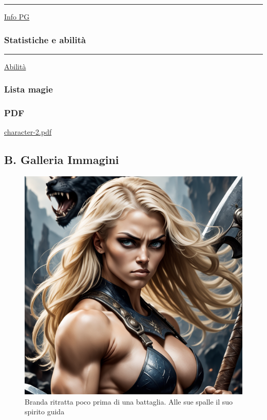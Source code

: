 \begin{center}\rule{0.5\linewidth}{0.5pt}\end{center}

\href{Info\%20PG\%207c4b83bfcd2e4a5382b1fdc0695356d4.csv}{Info PG}

\subsubsection{Statistiche e abilità}\label{statistiche-e-abilituxe0}

\begin{center}\rule{0.5\linewidth}{0.5pt}\end{center}

\href{Abilita\%CC\%80\%20598db4b9c1424724926dfa6e5f543ee8.csv}{Abilità}

\subsubsection{Lista magie}\label{lista-magie}

\subsubsection{PDF}\label{pdf}

\url{character-2.pdf}

\subsection{B. Galleria Immagini}\label{b.-galleria-immagini}

\begin{figure}
\centering
\includegraphics{create-a-picture-of-branda-a-fierce-and-legendary-woman-with-long-blonde-hair-shaved-on-half-of-her.png}
\caption{Branda ritratta poco prima di una battaglia. Alle sue spalle il
suo spirito guida}
\end{figure}

